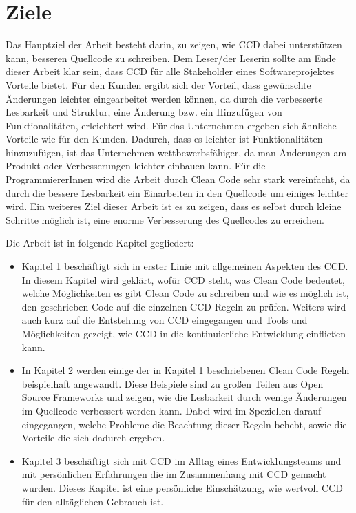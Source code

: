 \section{Ziele}
Das Hauptziel der Arbeit besteht darin, zu zeigen, wie CCD dabei unterstützen kann, besseren Quellcode zu schreiben. Dem Leser/der Leserin sollte am Ende dieser Arbeit klar sein, dass CCD für alle Stakeholder eines Softwareprojektes Vorteile bietet. Für den Kunden ergibt sich der Vorteil, dass gewünschte Änderungen leichter eingearbeitet werden können, da durch die verbesserte Lesbarkeit und Struktur, eine Änderung bzw. ein Hinzufügen von Funktionalitäten, erleichtert wird. Für das Unternehmen ergeben sich ähnliche Vorteile wie für den Kunden. Dadurch, dass es leichter ist Funktionalitäten hinzuzufügen, ist das Unternehmen wettbewerbsfähiger, da man Änderungen am Produkt oder Verbesserungen leichter einbauen kann. Für die ProgrammiererInnen wird die Arbeit durch Clean Code sehr stark vereinfacht, da durch die bessere Lesbarkeit ein Einarbeiten in den Quellcode um einiges leichter wird. Ein weiteres Ziel dieser Arbeit ist es zu zeigen, dass es selbst durch kleine Schritte möglich ist, eine enorme Verbesserung des Quellcodes zu erreichen. 

Die Arbeit ist in folgende Kapitel gegliedert:
\begin{itemize}
	\item Kapitel 1 beschäftigt sich in erster Linie mit allgemeinen Aspekten des CCD. In diesem Kapitel wird geklärt, wofür CCD steht, was Clean Code bedeutet, welche Möglichkeiten es gibt Clean Code zu schreiben und wie es möglich ist, den geschrieben Code auf die einzelnen CCD Regeln zu prüfen. Weiters wird auch kurz auf die Entstehung von CCD eingegangen und Tools und Möglichkeiten gezeigt, wie CCD in die kontinuierliche Entwicklung einfließen kann.
	\item In Kapitel 2 werden einige der in Kapitel 1 beschriebenen Clean Code Regeln beispielhaft angewandt. Diese Beispiele sind zu großen Teilen aus Open Source Frameworks und zeigen, wie die Lesbarkeit durch wenige Änderungen im Quellcode verbessert werden kann. Dabei wird im Speziellen darauf eingegangen, welche Probleme die Beachtung dieser Regeln behebt, sowie die Vorteile die sich dadurch ergeben.
	\item Kapitel 3 beschäftigt sich mit CCD im Alltag eines Entwicklungsteams und mit persönlichen Erfahrungen die im Zusammenhang mit CCD gemacht wurden. Dieses Kapitel ist eine persönliche Einschätzung, wie wertvoll CCD für den alltäglichen Gebrauch ist.
\end{itemize}

